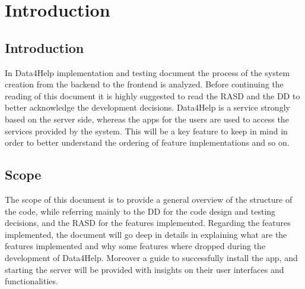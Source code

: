 \section{Introduction}

\subsection{Introduction}
In Data4Help implementation and testing document the process of the system creation from the backend to the frontend is analyzed. Before continuing the reading of this document it is highly suggested to read the RASD and the DD to better acknowledge the development decisions.
Data4Help is a service strongly based on the server side, whereas the apps for the users are used to access 
the services provided by the system.
This will be a key feature to keep in mind in order to better understand the ordering of feature implementations and so on.

\subsection{Scope}
The scope of this document is to provide a general overview of the structure of the code, while referring mainly to the DD for the code design and testing decisions, and the RASD for the features implemented.
Regarding the features implemented, the document will go deep in details in explaining what are the features implemented and why some features where dropped during the development of Data4Help.
Moreover a guide to successfully install the app, and starting the server will be provided with insights on their user interfaces and functionalities.